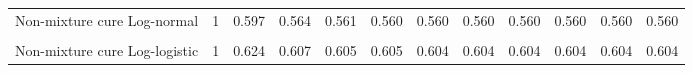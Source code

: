 \documentclass[
]{article}
\begin{document}
\begin{table}[H]
{\begin{tabular}[t]{lrrrrrrrrrrr}
Non-mixture cure Log-normal & 1 & 0.597 & 0.564 & 0.561 & 0.560 & 0.560 & 0.560 & 0.560 & 0.560 & 0.560 & 0.560\\
\cellcolor{gray!10}{Mixture cure Log-logistic} & \cellcolor{gray!10}{1} & \cellcolor{gray!10}{0.624} & \cellcolor{gray!10}{0.606} & \cellcolor{gray!10}{0.604} & \cellcolor{gray!10}{0.604} & \cellcolor{gray!10}{0.604} & \cellcolor{gray!10}{0.604} & \cellcolor{gray!10}{0.604} & \cellcolor{gray!10}{0.603} & \cellcolor{gray!10}{0.603} & \cellcolor{gray!10}{0.603}\\
Non-mixture cure Log-logistic & 1 & 0.624 & 0.607 & 0.605 & 0.605 & 0.604 & 0.604 & 0.604 & 0.604 & 0.604 & 0.604\\
\bottomrule
\end{tabular}}
\end{table}
\end{document}
